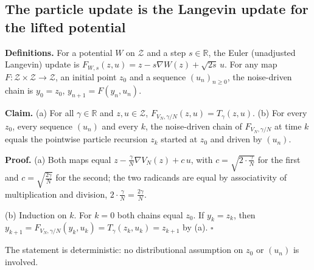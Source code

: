 \documentclass[11pt,a4paper]{report}
\begin{document}
\subsection{\texorpdfstring{The particle update is the Langevin update for the lifted potential}{The particle update is the Langevin update for the lifted potential}}
\label{report-step-IPLA-AlgorithmLaw-lean-3}


\textbf{Definitions.} For a potential \(W\) on \(\mathcal Z\) and a step \(s\in\mathbb R\), the Euler (unadjusted Langevin) update is \(F_{W,s}(z,u)=z-s\nabla W(z)+\sqrt{2s}\,u\). For any map \(F:\mathcal Z\times\mathcal Z\to\mathcal Z\), an initial point \(z_0\) and a sequence \((u_n)_{n\ge0}\), the noise-driven chain is \(y_0=z_0\), \(y_{n+1}=F(y_n,u_n)\).




\textbf{Claim.} (a) For all \(\gamma\in\mathbb R\) and \(z,u\in\mathcal Z\), \(F_{V_N,\gamma/N}(z,u)=T_\gamma(z,u)\). (b) For every \(z_0\), every sequence \((u_n)\) and every \(k\), the noise-driven chain of \(F_{V_N,\gamma/N}\) at time \(k\) equals the pointwise particle recursion \(z_k\) started at \(z_0\) and driven by \((u_n)\).




\textbf{Proof.} (a) Both maps equal \(z-\frac\gamma N\nabla V_N(z)+c\,u\), with \(c=\sqrt{2\cdot\frac\gamma N}\) for the first and \(c=\sqrt{\frac{2\gamma}N}\) for the second; the two radicands are equal by associativity of multiplication and division, \(2\cdot\frac\gamma N=\frac{2\gamma}N\).




(b) Induction on \(k\). For \(k=0\) both chains equal \(z_0\). If \(y_k=z_k\), then \(y_{k+1}=F_{V_N,\gamma/N}(y_k,u_k)=T_\gamma(z_k,u_k)=z_{k+1}\) by (a). \(\square\)




The statement is deterministic: no distributional assumption on \(z_0\) or \((u_n)\) is involved.
\end{document}
